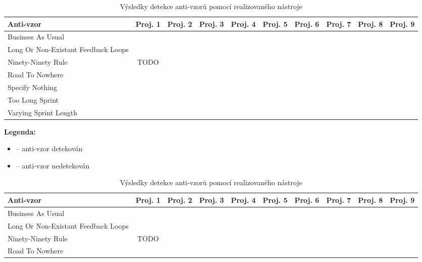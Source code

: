 \documentclass[czech,DP]{thesiskiv}
\newcommand{\cmark}{\ding{51}}%
\newcommand{\xmark}{\ding{55}}%
\begin{document}
\begin{landscape}
\begin{table}[]
\caption{\label{tab:table_result} Výsledky detekce anti-vzorů pomocí realizovaného nástroje}
\begin{tabular}{|l||c|c|c|c|c|c|c|c|c|}
\hline
Anti-vzor& Proj. 1 & Proj. 2 & Proj. 3 & Proj. 4 & Proj. 5 & Proj. 6 & Proj. 7 & Proj. 8 & Proj. 9 \\ \hline \hline
Business As Usual&\xmark&\xmark&\cmark&\xmark&\xmark&\xmark&\cmark&\xmark&\xmark\\ \hline
Long Or Non-Existant Feedback Loops&\cmark&\xmark&\cmark&\cmark&\xmark&\xmark&\xmark&\xmark&\xmark\\ \hline
Ninety-Ninety Rule&TODO&&&&&&&&\\ \hline
Road To Nowhere&\xmark&\xmark&\xmark&\xmark&\xmark&\xmark&\xmark&\xmark&\xmark\\ \hline
Specify Nothing&\cmark&\xmark&\xmark&\cmark&\xmark&\xmark&\xmark&\xmark&\xmark\\ \hline
Too Long Sprint&\cmark&\xmark&\cmark&\xmark&\xmark&\xmark&\xmark&\cmark&\cmark\\ \hline
Varying Sprint Length&\xmark&\xmark&\xmark&\xmark&\xmark&\xmark&\xmark&\cmark&\xmark\\ \hline
\end{tabular}
\end{table}
\textbf{Legenda:}
\begin{itemize}
    \item \cmark -- anti-vzor detekován
    \item \xmark -- anti-vzor nedetekován
\end{itemize}
\FloatBarrier
\newpage
\begin{table}[]
\caption{\label{tab:table_result} Výsledky detekce anti-vzorů pomocí realizovaného nástroje}
\begin{tabular}{|l||c|c|c|c|c|c|c|c|c|}
\hline
Anti-vzor& Proj. 1 & Proj. 2 & Proj. 3 & Proj. 4 & Proj. 5 & Proj. 6 & Proj. 7 & Proj. 8 & Proj. 9 \\ \hline \hline
Business As Usual&\xmark&\xmark&\cmark&\xmark&\xmark&\xmark&\cmark&\xmark&\xmark\\ \hline
Long Or Non-Existant Feedback Loops&\cmark&\xmark&\cmark&\cmark&\xmark&\xmark&\xmark&\xmark&\xmark\\ \hline
Ninety-Ninety Rule&TODO&&&&&&&&\\ \hline
Road To Nowhere&\xmark&\xmark&\xmark&\xmark&\xmark&\xmark&\xmark&\xmark&\xmark\\ \hline

\end{tabular}
\end{table}
\end{landscape}
\end{document}
